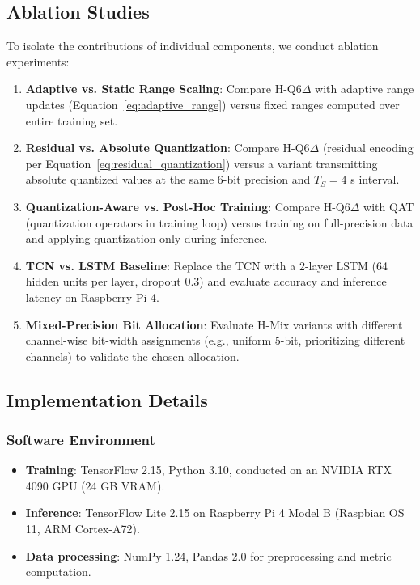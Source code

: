 \subsection{Ablation Studies}

To isolate the contributions of individual components, we conduct ablation experiments:

\begin{enumerate}
\item \textbf{Adaptive vs. Static Range Scaling}: Compare H-Q6$\Delta$ with adaptive range updates (Equation~\eqref{eq:adaptive_range}) versus fixed ranges computed over entire training set.

\item \textbf{Residual vs. Absolute Quantization}: Compare H-Q6$\Delta$ (residual encoding per Equation~\eqref{eq:residual_quantization}) versus a variant transmitting absolute quantized values at the same 6-bit precision and $T_S = 4$ s interval.

\item \textbf{Quantization-Aware vs. Post-Hoc Training}: Compare H-Q6$\Delta$ with QAT (quantization operators in training loop) versus training on full-precision data and applying quantization only during inference.

\item \textbf{TCN vs. LSTM Baseline}: Replace the TCN with a 2-layer LSTM (64 hidden units per layer, dropout 0.3) and evaluate accuracy and inference latency on Raspberry Pi 4.

\item \textbf{Mixed-Precision Bit Allocation}: Evaluate H-Mix variants with different channel-wise bit-width assignments (e.g., uniform 5-bit, prioritizing different channels) to validate the chosen allocation.
\end{enumerate}

\subsection{Implementation Details}

\subsubsection{Software Environment}
\begin{itemize}
\item \textbf{Training}: TensorFlow 2.15, Python 3.10, conducted on an NVIDIA RTX 4090 GPU (24 GB VRAM).
\item \textbf{Inference}: TensorFlow Lite 2.15 on Raspberry Pi 4 Model B (Raspbian OS 11, ARM Cortex-A72).
\item \textbf{Data processing}: NumPy 1.24, Pandas 2.0 for preprocessing and metric computation.
\end{itemize}

